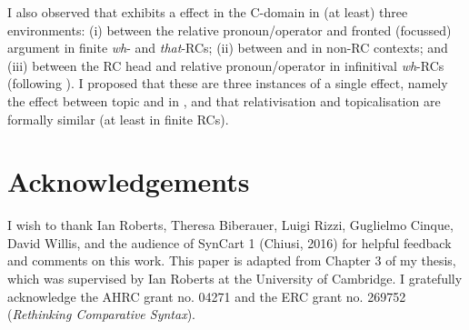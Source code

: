 \documentclass[output=paper]{langsci/langscibook}
\begin{document}
I also observed that  exhibits a  effect in the
C-domain in (at least) three environments: (i) between the relative
pronoun/operator and fronted (focussed) argument in finite \emph{wh}- and
\emph{that}-RCs; (ii) between  and  in non-RC contexts; and (iii)
between the \gls{RC} head and relative pronoun/operator in infinitival
\emph{wh}-\glspl{RC} (following \citealt{Richards2010}). I proposed that these are three
instances of a single effect, namely the  effect between
topic and  in , and that relativisation and topicalisation are
formally similar (at least in finite RCs).

\label{sec:abbreviations}

\printchapterglossary{}

\section*{Acknowledgements}

I wish to thank Ian Roberts, Theresa Biberauer, Luigi Rizzi, Guglielmo Cinque,
David Willis, and the audience of SynCart 1 (Chiusi, 2016) for helpful feedback
and comments on this work. This paper is adapted from Chapter 3 of my thesis,
which was supervised by Ian Roberts at the University of Cambridge. I
gratefully acknowledge the AHRC grant no. 04271 and the ERC grant no. 269752
(\emph{Rethinking Comparative Syntax}).

{\sloppy
\printbibliography[heading=subbibliography,notkeyword=this]
}
\end{document}
